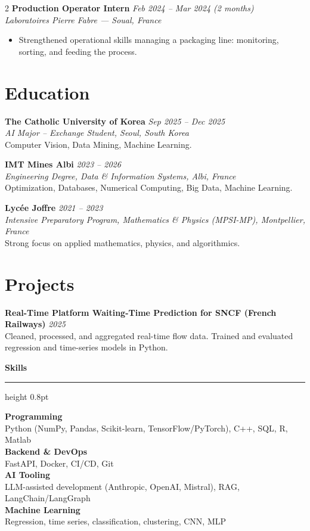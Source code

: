 \documentclass[10.5pt,a4paper]{article}
\newcommand{\sectionrule}{\vspace{-6pt}{\color{accent}\hrule height 1pt}\vspace{7pt}}
\newcommand{\subsectitle}[1]{%
  {\color{accent}\bfseries\large #1}\\[-2pt]
  {\color{accent}\hrule height 0.8pt}\vspace{7pt}
}
\newcommand{\cvexp}[5]{%
  \noindent\textbf{#1} \hfill {\itshape\color{graytext}\small #4}\\
  {\itshape #2 --- #3}\\[-2pt]
  #5
  \vspace{9pt}
}
\newcommand{\cvedu}[5]{%
  \noindent\textbf{#1} \hfill {\itshape\color{graytext}\small #4}\\
  {\itshape #2, #3}\\[1pt]
  {\small #5}
  \vspace{6pt}
}
\newcommand{\cvproject}[3]{%
  \noindent\textbf{#1} \hfill {\itshape\color{graytext}\small #2}\\[1pt]
  {\small #3}
  \vspace{5pt}
}
\newcommand{\sidebarline}[2]{%
  \noindent\textbf{\small #1}\\
  {\small #2}\\[3pt]
}
\begin{document}
\begin{paracol}{2}
\cvexp{Production Operator Intern}{Laboratoires Pierre Fabre}{Soual, France}{Feb 2024 -- Mar 2024 (2 months)}{%
  \begin{itemize}[leftmargin=12pt, itemsep=2pt, topsep=0pt, partopsep=0pt, parsep=0pt]
    \item Strengthened operational skills managing a packaging line: monitoring, sorting, and feeding the process.
  \end{itemize}
}

\section*{Education}
\sectionrule

\cvedu{The Catholic University of Korea}{AI Major -- Exchange Student}{Seoul, South Korea}{Sep 2025 -- Dec 2025}{Computer Vision, Data Mining, Machine Learning.}

\cvedu{IMT Mines Albi}{Engineering Degree, Data \& Information Systems}{Albi, France}{2023 -- 2026}{Optimization, Databases, Numerical Computing, Big Data, Machine Learning.}

\cvedu{Lycée Joffre}{Intensive Preparatory Program, Mathematics \& Physics (MPSI-MP)}{Montpellier, France}{2021 -- 2023}{Strong focus on applied mathematics, physics, and algorithmics.}

\section*{Projects}
\sectionrule

\cvproject{Real-Time Platform Waiting-Time Prediction for SNCF (French Railways)}{2025}{Cleaned, processed, and aggregated real-time flow data. Trained and evaluated regression and time-series models in Python.}

\switchcolumn

\vspace{-1pt}

\subsectitle{Skills}

\sidebarline{Programming}{Python (NumPy, Pandas, Scikit-learn, TensorFlow/\allowbreak PyTorch), C++, SQL, R, Matlab}
\sidebarline{Backend \& DevOps}{FastAPI, Docker, CI/CD, Git}
\sidebarline{AI Tooling}{LLM-assisted development (Anthropic, OpenAI, Mistral), RAG, LangChain/\allowbreak LangGraph}
\sidebarline{Machine Learning}{Regression, time series, classification, clustering, CNN, MLP}


\end{paracol}
\end{document}
